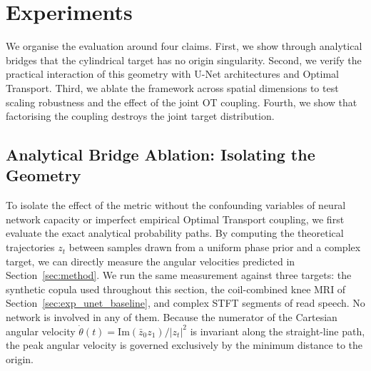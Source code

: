 \section{Experiments}
\label{sec:experiments}

We organise the evaluation around four claims. First, we show through analytical bridges that the cylindrical target has no origin singularity. Second, we verify the practical interaction of this geometry with U-Net architectures and Optimal Transport. Third, we ablate the framework across spatial dimensions to test scaling robustness and the effect of the joint OT coupling. Fourth, we show that factorising the coupling destroys the joint target distribution.

\subsection{Analytical Bridge Ablation: Isolating the Geometry}
\label{sec:exp_ablation}



To isolate the effect of the metric without the confounding variables of neural network capacity or imperfect empirical Optimal Transport coupling, we first evaluate the exact analytical probability paths. By computing the theoretical trajectories $z_t$ between samples drawn from a uniform phase prior and a complex target, we can directly measure the angular velocities predicted in Section~\ref{sec:method}. We run the same measurement against three targets: the synthetic copula used throughout this section, the coil-combined knee MRI of Section~\ref{sec:exp_unet_baseline}, and complex STFT segments of read speech. No network is involved in any of them. Because the numerator of the Cartesian angular velocity $\dot{\theta}(t) = \text{Im}(\bar{z}_0 z_1) / |z_t|^2$ is invariant along the straight-line path, the peak angular velocity is governed exclusively by the minimum distance to the origin.

